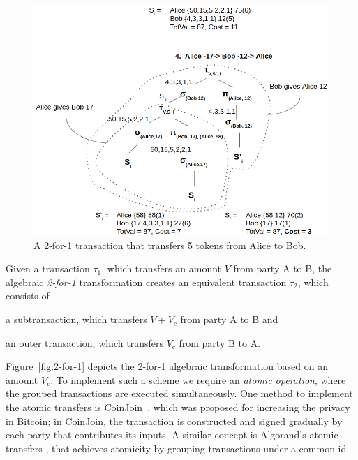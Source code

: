 \begin{figure}[h!]
    \centering
    \includegraphics[width=0.9\columnwidth,keepaspectratio]{figures/utxo_growth/4th_logical_plan.png}
    \caption{A 2-for-1 transaction that transfers 5 tokens from Alice to Bob.}
    \label{fig:4th_logical_plan.png}
\end{figure}

\begin{definition}\label{def:2-for-1}
        Given a transaction $\tau_1$, which transfers an amount $V$ from party
        A to B, the algebraic \emph{2-for-1} transformation creates an
        equivalent transaction $\tau_2$, which consists of
        \begin{inparaenum}[(a)]
            \item a subtransaction, which transfers $V+V_c$ from party A to B and
            \item an outer transaction, which transfers $V_c$ from party B to A.
        \end{inparaenum}
\end{definition}

Figure~\ref{fig:2-for-1} depicts the 2-for-1 algebraic transformation based on
an amount $V_c$. To
implement such a scheme we require an \emph{atomic operation}, where the
grouped transactions are executed simultaneously. One method to implement the
atomic transfers is CoinJoin~\cite{coinjoin}, which was proposed for increasing
the privacy in Bitcoin; in CoinJoin, the transaction is constructed and signed
gradually by each party that contributes its inputs. A similar concept is
Algorand's atomic transfers \cite{atomictransfers}, that achieves atomicity by
grouping transactions under a common id.

